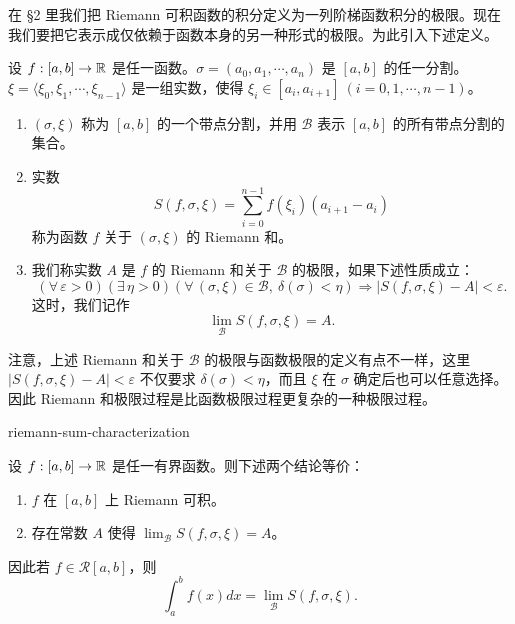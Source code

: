 在 §2 里我们把 Riemann 可积函数的积分定义为一列阶梯函数积分的极限。现在我们要把它表示成仅依赖于函数本身的另一种形式的极限。为此引入下述定义。

\begin{mydef*}{}

	设 \(f:[a,b]\to\mathbb{R}\) 是任一函数。\(\sigma=(a_0,a_1,\cdots,a_n)\) 是 \([a,b]\) 的任一分割。\(\xi=\langle\xi_0,\xi_1,\cdots,\xi_{n-1}\rangle\) 是一组实数，使得 \(\xi_i\in[a_i,a_{i+1}]\ (i=0,1,\cdots,n-1)\)。

	\begin{enumerate}[label=\arabic*)]
		\item \((\sigma,\xi)\) 称为 \([a,b]\) 的一个带点分割，并用 \(\mathscr{B}\) 表示 \([a,b]\) 的所有带点分割的集合。

		\item 实数
		\[
		S(f,\sigma,\xi)=\sum_{i=0}^{n-1}f(\xi_i)(a_{i+1}-a_i)
		\]
		称为函数 \(f\) 关于 \((\sigma,\xi)\) 的 Riemann 和。

		\item 我们称实数 \(A\) 是 \(f\) 的 Riemann 和关于 \(\mathscr{B}\) 的极限，如果下述性质成立：
		\[
		(\forall\,\varepsilon>0)(\exists\,\eta>0)(\forall\,(\sigma,\xi)\in\mathscr{B},\ \delta(\sigma)<\eta)\Longrightarrow|S(f,\sigma,\xi)-A|<\varepsilon.
		\]
		这时，我们记作
		\[
		\lim_{\mathscr{B}}S(f,\sigma,\xi)=A.
		\]
	\end{enumerate}

\end{mydef*}

注意，上述 Riemann 和关于 \(\mathscr{B}\) 的极限与函数极限的定义有点不一样，这里 \(|S(f,\sigma,\xi)-A|<\varepsilon\) 不仅要求 \(\delta(\sigma)<\eta\)，而且 \(\xi\) 在 \(\sigma\) 确定后也可以任意选择。因此 Riemann 和极限过程是比函数极限过程更复杂的一种极限过程。

\begin{mythm}{}{riemann-sum-characterization}

	设 \(f:[a,b]\to\mathbb{R}\) 是任一有界函数。则下述两个结论等价：

	\begin{enumerate}[label=\arabic*)]
		\item \(f\) 在 \([a,b]\) 上 Riemann 可积。

		\item 存在常数 \(A\) 使得 \(\displaystyle\lim_{\mathscr{B}}S(f,\sigma,\xi)=A\)。
	\end{enumerate}

	因此若 \(f\in\mathscr{R}[a,b]\)，则
	\[
	\int_a^b f(x)dx=\lim_{\mathscr{B}}S(f,\sigma,\xi).
	\]

\end{mythm}

